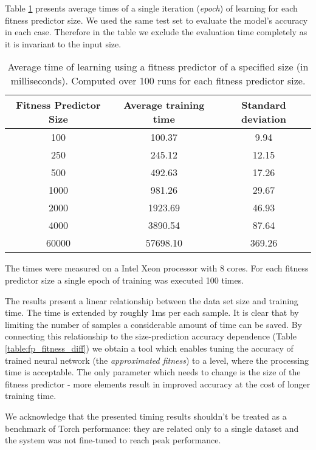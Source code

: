 \documentclass{llncs}
\begin{document}
Table \ref{table:fp_eval_time} presents average times of a single iteration (\emph{epoch}) of learning for each fitness predictor size. We used the same test set to evaluate the model's accuracy in each case. Therefore in the table we exclude the evaluation time completely as it is invariant to the input size.

\begin{table}

    \center
    \begin{tabular}{|c|c|c|}
        \hline
        Fitness Predictor Size & Average training time & Standard deviation \\
        \hline
        100 & 100.37 & 9.94 \\
        250 & 245.12 & 12.15 \\
        500 & 492.63 & 17.26 \\
        1000 & 981.26 & 29.67 \\
        2000 & 1923.69 & 46.93 \\
        4000 & 3890.54 & 87.64 \\
        60000 & 57698.10 & 369.26 \\
        \hline
    \end{tabular}

    \caption{Average time of learning using a fitness predictor of a specified size (in milliseconds). Computed over 100 runs for each fitness predictor size.}
    \label{table:fp_eval_time}

\end{table}
 
The times were measured on a Intel Xeon processor with 8 cores. For each fitness predictor size a single epoch of training was executed 100 times. 

The results present a linear relationship between the data set size and training time. The time is extended by roughly 1ms per each sample. It is clear that by limiting the number of samples a considerable amount of time can be saved. By connecting this relationship to the size-prediction accuracy dependence (Table \ref{table:fp_fitness_diff}) we obtain a tool which enables tuning the accuracy of trained neural network (the \emph{approximated fitness}) to a level, where the processing time is acceptable. The only parameter which needs to change is the size of the fitness predictor - more elements result in improved accuracy at the cost of longer training time.

We acknowledge that the presented timing results shouldn't be treated as a benchmark of Torch performance: they are related only to a single dataset and the system was not fine-tuned to reach peak performance.
\end{document}
